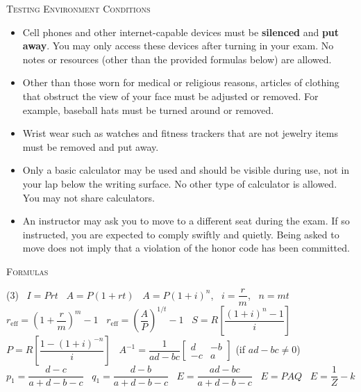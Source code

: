 \noindent \textsc{Testing Environment Conditions}
\begin{small}
\begin{itemize}
\item Cell phones and other internet-capable devices must be \textbf{silenced} and \textbf{put away}. You may only access these devices after turning in your exam. No notes or resources (other than the provided formulas below) are allowed.
\item Other than those worn for medical or religious reasons, articles of clothing that obstruct the view of your face must be adjusted or removed. For example, baseball hats must be turned around or removed.
\item Wrist wear such as watches and fitness trackers that are not jewelry items must be removed and put away.
\item Only a basic calculator may be used and should be visible during use, not in your lap below the writing surface. No other type of calculator is allowed. You may not share calculators.
\item An instructor may ask you to move to a different seat during the exam. If so instructed, you are expected to comply swiftly and quietly. Being asked to move does not imply that a violation of the honor code has been committed.\\
\end{itemize}
\end{small}

\noindent \textsc{Formulas}

\begin{tasks}(3)
  \task[\textbf{A. }] \ \(I=Prt\)
  \task[\textbf{B. }] \ \(A=P(1+rt)\)
  \task[\textbf{C. }] \ \(A=P(1+i)^n\), \ \(i=\dfrac{r}{m}\), \ \(n=mt\)
  \task[\textbf{D. }] \ \(r_{\text{eff}}=\left(1+\dfrac{r}{m}\right)^m - 1\)
  \task[\textbf{E. }] \ \(r_{\text{eff}} = \left(\dfrac{A}{P}\right)^{1/t} - 1\)
  \task[\textbf{F. }] \ \(S = R\left[\dfrac{(1+i)^n-1}{i} \right]\)
  \task[\textbf{G. }] \ \(P = R\left[\dfrac{1-(1+i)^{-n}}{i} \right]\)
  \task[\textbf{H. }] \ \(A^{-1} = \dfrac{1}{ad-bc}\begin{bmatrix} d & -b \\ -c & a\end{bmatrix}\)
  \task[] \hspace{-.6in}(if \(ad-bc\not=0\))
  \task[\textbf{I. }] \ \(p_1 = \dfrac{d-c}{a+d-b-c}\)
  \task[\textbf{J. }] \ \(q_1 = \dfrac{d-b}{a+d-b-c}\)
  \task[\textbf{K. }] \ \(E = \dfrac{ad-bc}{a+d-b-c}\)
  \task[\textbf{L. }] \ \(E = PAQ\)
  \task[\textbf{M. }] \ \(E = \dfrac{1}{Z}-k\)
\end{tasks}

